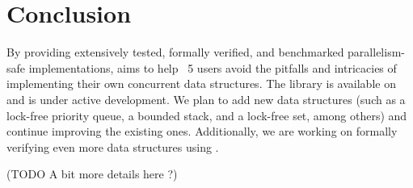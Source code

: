 \documentclass[a4paper, 11pt]{article}
\begin{document}
\section{Conclusion}
By providing extensively tested, formally verified, and benchmarked parallelism-safe implementations, \Saturn aims to help \OCaml~5 users avoid the pitfalls and intricacies of implementing their own concurrent data structures. The library is available on \opam and is under active development. We plan to add new data structures (such as a lock-free priority queue, a bounded stack, and a lock-free set, among others) and continue improving the existing ones. Additionally, we are working on formally verifying even more data structures using \Iris. 

(TODO A bit more details here ?)



\printbibliography
\end{document}

